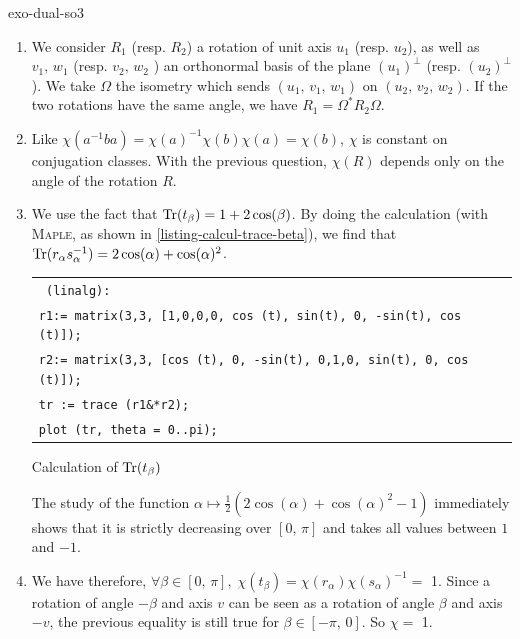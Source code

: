  
\begin{correction}{exo-dual-so3}
\begin{enumerate}
\item We consider $ R_1 $ (resp. $ R_2 $) a rotation of unit axis $ u_1 $ (resp. $ u_2 $), as well as $ v_1, \, w_1 $ (resp. $ v_2, \, w_2 $ ) an orthonormal basis of the plane $ (u_1)^\bot $ (resp. $ (u_2)^\bot $). We take $ \Omega $ the isometry which sends $ (u_1, \, v_1, \, w_1) $ on $ (u_2, \, v_2, \, w_2) $. If the two rotations have the same angle, we have $ R_1 = \Omega^* R_2 \Omega $.
\item Like $ \chi (a^{-1} ba) = \chi (a)^{-1} \chi (b) \chi (a) = \chi (b) $, $ \chi $ is constant on conjugation classes. With the previous question, $ \chi (R) $ depends only on the angle of the rotation $ R $.
\item {} We use the fact that $ \operatorname{Tr} (t_\beta) = 1 + 2 \cos (\beta) $. By doing the calculation (with \textsc{Maple}, as shown in \listingterme{} \ref{listing-calcul-trace-beta}), we find that $ \operatorname{Tr} (r_{\alpha} s_{\alpha}^{-1}) = 2 \cos (\alpha) + \cos (\alpha)^2 $.
 
\begin{listing} \begin{footnotesize}
{\upshape
\begin{tabular}{l} \texttt{\pwith{} (linalg):} \\
\texttt{r1:= matrix(3,3, [1,0,0,0, cos (t), sin(t), 0, -sin(t), cos (t)]);} \\
\texttt{r2:= matrix(3,3, [cos (t), 0, -sin(t), 0,1,0, sin(t), 0, cos (t)]);} \\
\texttt{tr := trace (r1\&*r2);} \\
\texttt{plot (tr, theta = 0..pi);} \\
\end{tabular}
}
\end{footnotesize}
\caption{Calculation of $ \tr (t_\beta) $}
 
\label{listing-calcul-trace-beta}
\end{listing}
The study of the function $ \alpha \mapsto \frac{1}{2} (2 \cos (\alpha) + \cos (\alpha)^2-1) $ immediately shows that it is strictly decreasing over $ [0, \, \pi] $ and takes all values between $ 1 $ and $ -1 $.
\item We have therefore, $ \forall \beta \in [0, \, \pi], \; \chi (t_\beta) = \chi (r_\alpha) \chi (s_\alpha)^{-1} = $ 1. Since a rotation of angle $ - \beta $ and axis $ v $ can be seen as a rotation of angle $ \beta $ and axis $ -v $, the previous equality is still true for $ \beta \in [- \pi, \, 0] $. So $ \chi = $ 1.
\end{enumerate}
\end{correction}
 
